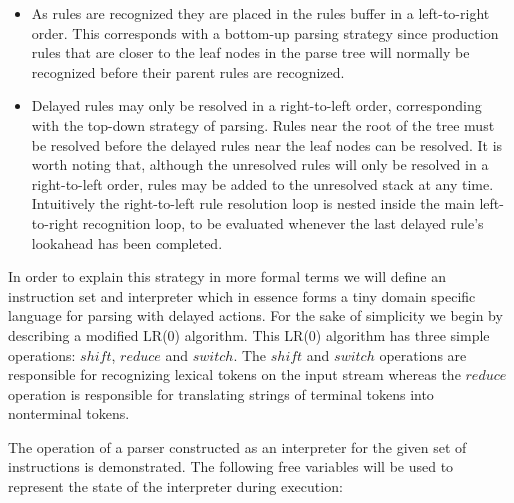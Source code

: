 \documentclass[a4paper,11pt]{article}
\begin{document}
\begin{itemize}
\item As rules are recognized they are placed in the rules buffer in a left-to-right order. 
This corresponds with a bottom-up parsing strategy since production rules that are closer to the leaf nodes in the parse tree will normally be recognized before their parent rules are recognized.
\item Delayed rules may only be resolved in a right-to-left order, corresponding with the top-down strategy of parsing. Rules near the root of the tree must be resolved before 
the delayed rules near the leaf nodes can be resolved. 
It is worth noting that, although the unresolved rules will only be resolved in a right-to-left order, rules may be added to the unresolved stack at any time.
Intuitively the right-to-left rule resolution loop is nested inside the main left-to-right recognition loop, to be evaluated whenever the last delayed rule's lookahead has been completed.
\end{itemize}

In order to explain this strategy in more formal terms we will define an instruction set and interpreter which in essence forms a tiny domain specific language for parsing with delayed actions.
For the sake of simplicity we begin by describing a modified LR(0) algorithm. This LR(0) algorithm has three simple operations: $shi\!ft$, $reduce$ and $switch$. 
The $shi\!ft$ and $switch$ operations are responsible for recognizing lexical tokens on the input stream whereas the $reduce$ operation is responsible for translating strings of terminal tokens into nonterminal tokens.

The operation of a parser constructed as an interpreter for the given set of instructions is demonstrated.
The following free variables will be used to represent the state of the interpreter during execution:
\end{document}

